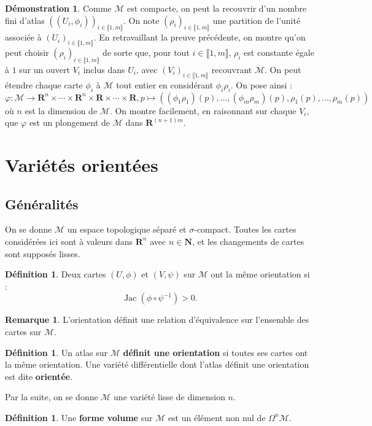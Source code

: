 \documentclass[12pt,a4paper]{article}
\DeclareMathOperator{\Jac}{Jac}
\theoremstyle{definition}
\newtheorem{defn}[thm]{Définition}
\newtheorem{rqe}[thm]{Remarque}
\newtheorem*{dem}{Démonstration}
\begin{document}
\begin{dem}
Comme $\mathcal{M}$ est compacte, on peut la recouvrir d'un nombre fini d'atlas $((U_i,\phi_i))_{i\in\llbracket 1,m\rrbracket}$. On note $(\rho_i)_{i\in\llbracket 1,m\rrbracket}$ une partition de l'unité associée à $(U_i)_{i\in\llbracket 1,m\rrbracket}$. En retravaillant la preuve précédente, on montre qu'on peut choisir $(\rho_i)_{i\in\llbracket 1,m\rrbracket}$ de sorte que, pour tout $i\in\llbracket 1,m\rrbracket$, $\rho_i$ est constante égale à $1$ sur un ouvert $V_i$ inclus dans $U_i$, avec $(V_i)_{i\in\llbracket 1,m\rrbracket}$ recouvrant $\mathcal{M}$. On peut étendre chaque carte $\phi_i$ à $\mathcal{M}$ tout entier en considérant $\phi_i\rho_i$. On pose ainsi :
$$\varphi:\mathcal{M}\to\mathbf{R}^n\times\cdots\times\mathbf{R}^n\times\mathbf{R}\times\cdots\times\mathbf{R},p\mapsto\left((\phi_1\rho_1)(p),\ldots,(\phi_m\rho_m)(p),\rho_1(p),\ldots,\rho_m(p)\right)$$
où $n$ est la dimension de $\mathcal{M}$. On montre facilement, en raisonnant sur chaque $V_i$, que $\varphi$ est un plongement de $\mathcal{M}$ dans $\mathbf{R}^{(n+1)m}$.
\end{dem}
\newpage
\section{Variétés orientées}
\subsection{Généralités}
On se donne $\mathcal{M}$ un espace topologique séparé et $\sigma$-compact. Toutes les cartes considérées ici sont à valeurs dans $\mathbf{R}^n$ avec $n\in\mathbf{N}$, et les changements de cartes sont supposés lisses.
\begin{defn}
Deux cartes $(U,\phi)$ et $(V,\psi)$ sur $\mathcal{M}$ ont la même orientation si :$$\Jac(\phi\circ\psi^{-1})>0.$$
\end{defn}
\begin{rqe}
L'orientation définit une relation d'équivalence sur l'ensemble des cartes sur $\mathcal{M}$.
\end{rqe}
\begin{defn}
Un atlas sur $\mathcal{M}$ \textbf{définit une orientation} si toutes ses cartes ont la même orientation. Une variété différentielle dont l'atlas définit une orientation est dite \textbf{orientée}.
\end{defn}
Par la suite, on se donne $\mathcal{M}$ une variété lisse de dimension $n$.
\begin{defn}
Une \textbf{forme volume} sur $\mathcal{M}$ est un élément non nul de $\Omega^n\mathcal{M}$.
\end{defn}
\end{document}
